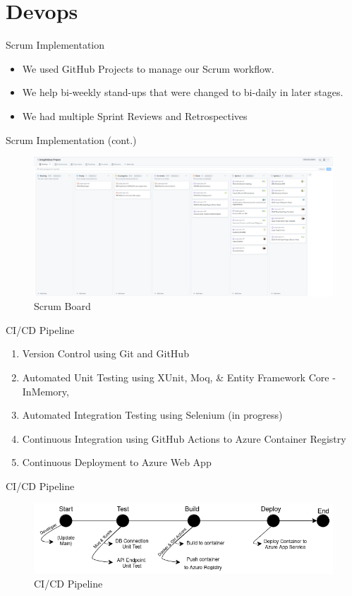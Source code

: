 \documentclass{beamer}
\begin{document}
\section{Devops}
\begin{frame}{Scrum Implementation}
    \begin{itemize}
        \item We used GitHub Projects to manage our Scrum workflow.
        \item We help bi-weekly stand-ups that were changed to bi-daily in later stages.
        \item We had multiple Sprint Reviews and Retrospectives
    \end{itemize}
\end{frame}
\begin{frame}{Scrum Implementation (cont.)}
    \begin{figure}
        \centering
        \includegraphics[width=1\textwidth]{Images/ScrumBoard.png}
        \caption{Scrum Board}
    \end{figure}
\end{frame}

\begin{frame}{CI/CD Pipeline}
    \begin{enumerate}
        \item Version Control using Git and GitHub
        \item Automated Unit Testing using XUnit, Moq, \& Entity Framework Core - InMemory, 
        \item Automated Integration Testing using Selenium (in progress)
        \item Continuous Integration using GitHub Actions to Azure Container Registry
        \item Continuous Deployment to Azure Web App
    \end{enumerate}

\end{frame}
\begin{frame}{CI/CD Pipeline}
    \begin{figure}
        \centering
        \includegraphics[width=1\textwidth]{Images/Devops.png}
        \caption{CI/CD Pipeline}
    \end{figure}
\end{frame}
\end{document}
